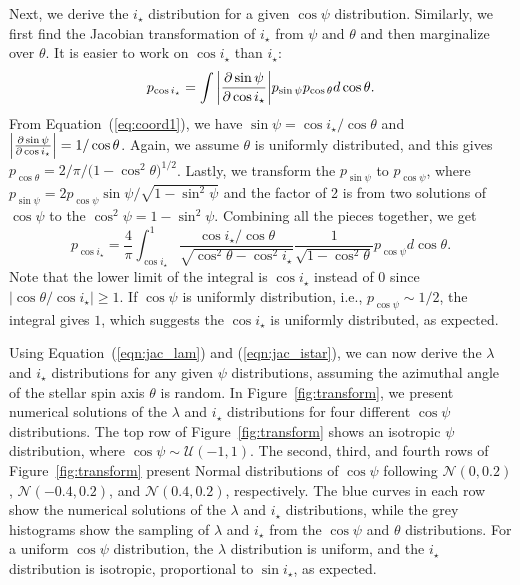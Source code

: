 \documentclass[twocolumn,times]{aastex631}
\begin{document}
Next, we derive the $i_\star$ distribution for a given $\cos{\psi}$ distribution. Similarly, we first find the Jacobian transformation of $i_\star$ from $\psi$ and $\theta$ and then marginalize over $\theta$. It is easier to work on $\cos{i_\star}$ than $i_\star$:
\begin{equation}
    p_{\cos{i_\star}} = \int \abs{\pdv{\sin{\psi}}{\cos{i_\star}}} p_{\sin{\psi}} p_{\cos{\theta}} d\cos{\theta}.
\end{equation}
From Equation~(\ref{eq:coord1}), we have $\sin{\psi} = \cos{i_\star}/\cos{\theta}$ and $\abs{\pdv{\sin{\psi}}{\cos{i_\star}}} = 1/\cos{\theta}$. Again, we assume $\theta$ is uniformly distributed, and this gives $p_{\cos{\theta}} = 2/\pi/(1-\cos^2{\theta)^{1/2}}$. Lastly, we transform the $p_{\sin{\psi}}$ to $p_{\cos{\psi}}$, where $p_{\sin{\psi}} = 2p_{\cos{\psi}}\sin{\psi}/\sqrt{1-\sin^2{\psi}}$ and the factor of 2 is from two solutions of $\cos{\psi}$ to the $\cos^2{\psi} = 1-\sin^2{\psi}$. Combining all the pieces together, we get
\begin{equation}\label{eqn:jac_istar}
    p_{\cos{i_\star}} = \frac{4}{\pi} \int_{\cos{i_\star}}^{1} \frac{\cos{i_\star}/\cos{\theta}}{\sqrt{\cos^2{\theta}-\cos^2{i_\star}}} \frac{1}{\sqrt{1-\cos^2{\theta}}} p_{\cos{\psi}} d\cos{\theta}.
\end{equation}
Note that the lower limit of the integral is $\cos{i_\star}$ instead of 0 since $\lvert \cos{\theta}/\cos{i_\star} \rvert \geqslant 1$.
If $\cos{\psi}$ is uniformly distribution, i.e., $p_{\cos{\psi}} \sim 1/2$, the integral gives $1$, which suggests the $\cos{i_\star}$ is uniformly distributed, as expected.

Using Equation~(\ref{eqn:jac_lam}) and (\ref{eqn:jac_istar}), we can now derive the $\lambda$ and $i_\star$ distributions for any given $\psi$ distributions, assuming the azimuthal angle of the stellar spin axis $\theta$ is random. In Figure~\ref{fig:transform}, we present numerical solutions of the $\lambda$ and $i_\star$ distributions for four different $\cos{\psi}$ distributions. The top row of Figure~\ref{fig:transform} shows an isotropic $\psi$ distribution, where $\cos{\psi} \sim \mathcal{U}(-1,1)$. The second, third, and fourth rows of Figure~\ref{fig:transform} present Normal distributions of $\cos{\psi}$ following $\mathcal{N}(0,0.2)$, $\mathcal{N}(-0.4,0.2)$, and $\mathcal{N}(0.4,0.2)$, respectively. 
The blue curves in each row show the numerical solutions of the $\lambda$ and $i_\star$ distributions, while the grey histograms show the sampling of $\lambda$ and $i_\star$ from the $\cos{\psi}$ and $\theta$ distributions. 
For a uniform $\cos{\psi}$ distribution, the $\lambda$ distribution is uniform, and the $i_\star$ distribution is isotropic, proportional to $\sin{i_\star}$, as expected.
\end{document}
